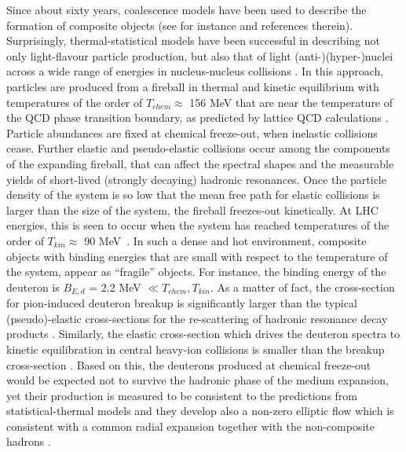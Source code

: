 Since about sixty years, coalescence models have been used to describe the formation of composite objects (see for instance \cite{Butler:1963, Kapusta:1980, Sato:1981ez, Nagle:1996vp, Scheibl:1998tk, Cho:2017dcy, Blum:2017qnn, Bazak:2018hgl, Zhao:2018lyf} and references therein).
Surprisingly, thermal-statistical models have been successful in describing not only light-flavour particle production, but also that of light (anti-)(hyper-)nuclei across a wide range of energies in nucleus-nucleus collisions \cite{Andronic:2017, Andronic:2010qu}. 
In this approach, particles are produced from a fireball in thermal and kinetic equilibrium with temperatures of the order of $T_{chem} \approx$ 156 MeV that are near the temperature of the QCD phase transition boundary, as predicted by lattice QCD calculations \cite{Bazavov:2014pvz,Bellwied:2013cta}. Particle abundances are fixed at chemical freeze-out, when inelastic collisions cease. Further elastic and pseudo-elastic collisions occur among the components of the expanding fireball, that can affect the spectral shapes and the measurable yields of short-lived (strongly decaying) hadronic resonances. Once the particle density of the system is so low that the mean free path for elastic collisions is larger than the size of the system, the fireball freezes-out kinetically. At LHC energies, this is seen to occur when the system has reached temperatures of the order of $T_{kin} \approx$ 90 MeV~\cite{Abelev:2013vea}. 
In such a dense and hot environment, composite objects with binding energies that are small with respect to the temperature of the system, appear as ``fragile'' objects. For instance, the binding energy of the deuteron is $B_{E, d}$ = 2.2 MeV $\ll T_{chem}, T_{kin}$.
As a matter of fact, the cross-section for pion-induced deuteron breakup is significantly larger than the typical (pseudo)-elastic cross-sections for the re-scattering of hadronic resonance decay products \cite{Garcilazo:1982yc, Bass:1998ca, Schukraft:2017nbn}. 
Similarly, the elastic cross-section which drives the deuteron spectra to kinetic equilibration in central heavy-ion collisions \cite{Acharya:2017dmc} is smaller than the breakup cross-section \cite{Garcilazo:1982yc, Bass:1998ca, Schukraft:2017nbn}.   
Based on this, the deuterons produced at chemical freeze-out would be expected not to survive the hadronic phase of the medium expansion, yet their production is measured to be consistent to the predictions from statistical-thermal models and they develop also a non-zero elliptic flow which is consistent with a common radial expansion together with the non-composite hadrons \cite{Acharya:2017dmc}. 
